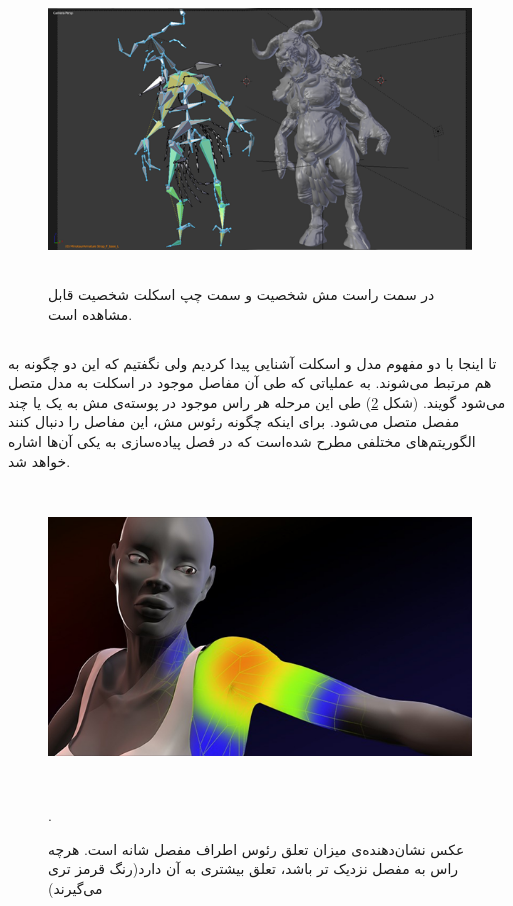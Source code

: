 \begin{figure}[ht]
	\centerline{\includegraphics[width=\textwidth,height=8cm,keepaspectratio]{Figures/Ch2/SkeletalModel.png}}

	\caption{در سمت راست مش شخصیت و سمت چپ اسکلت شخصیت قابل مشاهده است.\cite{SkeletalModelSource}}
	\label{fig:SkeletalModel}
\end{figure}




\subsection{
}

تا اینجا با دو مفهوم مدل و اسکلت آشنایی پیدا کردیم ولی نگفتیم که این دو چگونه به هم مرتبط می‌شوند.
به عملیاتی که طی آن مفاصل موجود در اسکلت به مدل متصل می‌شود 
گویند.
(شکل \ref{fig:Skinning})
طی این مرحله هر راس موجود در پوسته‌ی مش به یک یا چند مفصل متصل می‌شود.
برای اینکه چگونه رئوس مش، این مفاصل را دنبال کنند الگوریتم‌های مختلفی مطرح شده‌است که در فصل پیاده‌سازی به یکی آن‌ها اشاره ‌خواهد شد.

\begin{figure}[ht]
	\centerline{\includegraphics[width=\textwidth,height=8cm,keepaspectratio]{Figures/Ch2/Skinning.png}}

	\caption{عکس نشان‌دهنده‌ی میزان تعلق رئوس اطراف مفصل شانه است. هرچه راس به مفصل نزدیک تر باشد، تعلق بیشتری به آن دارد(رنگ قرمز تری می‌گیرند) \cite{SkinningSource}}.
	\label{fig:Skinning}
\end{figure}




